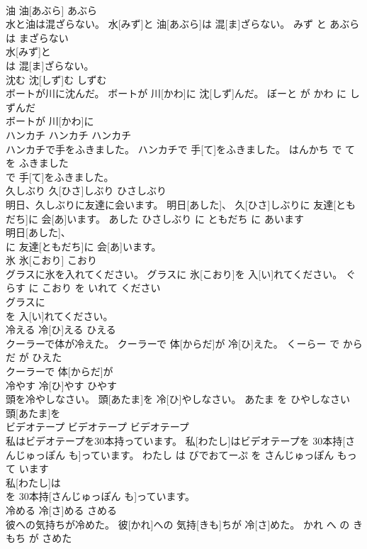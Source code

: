 \documentclass[8pt]{extreport}
\begin{document}
\begin{CJK}{UTF8}{min}
\\	油	油[あぶら]	あぶら	
\\	水と油は混ざらない。	水[みず]と 油[あぶら]は 混[ま]ざらない。	みず と あぶら は まざらない	
\\	水[みず]と
\\	は 混[ま]ざらない。			
\\	沈む	沈[しず]む	しずむ	
\\	ボートが川に沈んだ。	ボートが 川[かわ]に 沈[しず]んだ。	ぼーと が かわ に しずんだ	
\\	ボートが 川[かわ]に
\\	ハンカチ	ハンカチ	ハンカチ	
\\	ハンカチで手をふきました。	ハンカチで 手[て]をふきました。	はんかち で て を ふきました	
\\	で 手[て]をふきました。			
\\	久しぶり	久[ひさ]しぶり	ひさしぶり	
\\	明日、久しぶりに友達に会います。	明日[あした]、 久[ひさ]しぶりに 友達[ともだち]に 会[あ]います。	あした ひさしぶり に ともだち に あいます	
\\	明日[あした]、
\\	に 友達[ともだち]に 会[あ]います。			
\\	氷	氷[こおり]	こおり	
\\	グラスに氷を入れてください。	グラスに 氷[こおり]を 入[い]れてください。	ぐらす に こおり を いれて ください	
\\	グラスに
\\	を 入[い]れてください。			
\\	冷える	冷[ひ]える	ひえる	
\\	クーラーで体が冷えた。	クーラーで 体[からだ]が 冷[ひ]えた。	くーらー で からだ が ひえた	
\\	クーラーで 体[からだ]が
\\	冷やす	冷[ひ]やす	ひやす	
\\	頭を冷やしなさい。	頭[あたま]を 冷[ひ]やしなさい。	あたま を ひやしなさい	
\\	頭[あたま]を
\\	ビデオテープ	ビデオテープ	ビデオテープ	
\\	私はビデオテープを30本持っています。	私[わたし]はビデオテープを 30本持[さんじゅっぽん も]っています。	わたし は びでおてーぷ を さんじゅっぽん もって います	
\\	私[わたし]は
\\	を 30本持[さんじゅっぽん も]っています。			
\\	冷める	冷[さ]める	さめる	
\\	彼への気持ちが冷めた。	彼[かれ]への 気持[きも]ちが 冷[さ]めた。	かれ へ の きもち が さめた	

\end{CJK}
\end{document}
